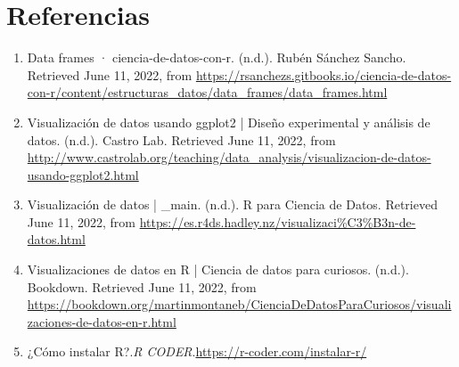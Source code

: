 \documentclass{article}
\begin{document}
\section{Referencias}
\begin{enumerate}
    \item Data frames · ciencia-de-datos-con-r. (n.d.). Rubén Sánchez Sancho. Retrieved June 11, 2022, from \url{https://rsanchezs.gitbooks.io/ciencia-de-datos-con-r/content/estructuras_datos/data_frames/data_frames.html}
    \item Visualización de datos usando ggplot2 | Diseño experimental y análisis de datos. (n.d.). Castro Lab. Retrieved June 11, 2022, from \url{http://www.castrolab.org/teaching/data_analysis/visualizacion-de-datos-usando-ggplot2.html}
    \item Visualización de datos | \_main. (n.d.). R para Ciencia de Datos. Retrieved June 11, 2022, from \url{https://es.r4ds.hadley.nz/visualizaci%C3%B3n-de-datos.html}
    \item Visualizaciones de datos en R | Ciencia de datos para curiosos. (n.d.). Bookdown. Retrieved June 11, 2022, from \url{https://bookdown.org/martinmontaneb/CienciaDeDatosParaCuriosos/visualizaciones-de-datos-en-r.html}
    \item¿Cómo instalar R?.\textit{R CODER}.\url{https://r-coder.com/instalar-r/}
\end{enumerate}
\end{document}

